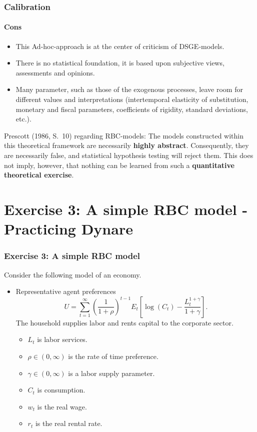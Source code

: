 \documentclass{beamer} %
\begin{document}
\begin{frame}\frametitle{Calibration}\framesubtitle{Cons}
\begin{itemize}
   \item This Ad-hoc-approach is at the center of criticism of
       DSGE-models.
   \item There is no statistical foundation, it is based upon subjective
       views, assessments and opinions.
   \item Many parameter, such as those of the exogenous processes, leave
       room for different values and interpretations (intertemporal
       elasticity of substitution, monetary and fiscal parameters,
       coefficients of rigidity, standard deviations, etc.).
\end{itemize}
\begin{block}{Prescott (1986, S.~10) regarding RBC-models:} The models constructed within this theoretical framework are
necessarily \textbf{highly abstract}. Consequently, they are necessarily
false, and statistical hypothesis testing will reject them. This does not
imply, however, that nothing can be learned from such a \textbf{quantitative
theoretical exercise}.\end{block}
\end{frame}

\section{Exercise 3: A simple RBC model - Practicing Dynare}
\begin{frame}
  \frametitle{Exercise 3: A simple RBC model}
  Consider the following model of an economy.
\begin{itemize}

\item Representative agent preferences
\begin{equation*}
U=\sum_{t=1}^{\infty }\left( \frac{1}{1+\rho }\right) ^{t-1}E_{t}\left[ \log
\left( C_{t}\right) -\frac{L_{t}^{1+\gamma }}{1+\gamma }\right] .
\end{equation*}%
The household supplies labor and rents capital to the corporate sector.
\begin{itemize}
\item $L_{t}$ is labor services.
\item $\rho \in \left( 0,\infty \right) $
is the rate of time preference.
\item $\gamma \in \left( 0,\infty \right) $ is a
labor supply parameter.
\item $C_{t}$ is consumption.
\item $w_{t}$ is the real wage.
\item $r_{t}$ is the real rental rate.
\end{itemize}
\end{itemize}
\end{frame}
\end{document}
